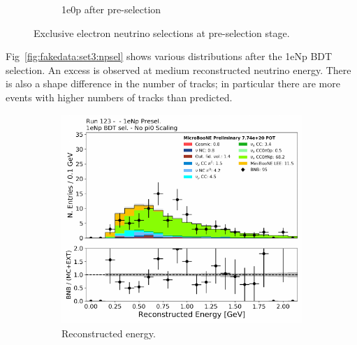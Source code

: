 \begin{figure}[H]
\begin{center}
\begin{subfigure}[b]{0.45\textwidth}
    \caption{\label{fig:fakedata:set3:2shr0p} 1e0p after pre-selection}
    \end{subfigure}
\caption{\label{fig:fakedata:set3:presel} Exclusive electron neutrino selections at pre-selection stage.}
\end{center}
\end{figure}

Fig~\ref{fig:fakedata:set3:npsel} shows various distributions after the 1eNp BDT selection.  An excess is observed at medium reconstructed neutrino energy. There is also a shape difference in the number of tracks; in particular there are more events with higher numbers of tracks than predicted. 

\begin{figure}[H] 
\begin{center}
    \begin{subfigure}[b]{0.45\textwidth}
    \centering
    \includegraphics[width=1.00\textwidth]{Fakedata/set3/Np_postsel_recoe.pdf}
    \caption{\label{fig:fakedata:set3:Np_postsel_recoe} Reconstructed energy.}
    \end{subfigure}
    \begin{subfigure}[b]{0.45\textwidth}
    \centering

\end{subfigure}
\end{center}
\end{figure}
